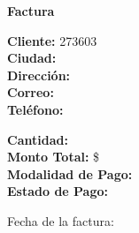 \documentclass{article}
\begin{document}
\begin{center}
    {\LARGE \textbf{Factura}}\\[1cm]
\end{center}

\textbf{Cliente:} 273603 \\
\textbf{Ciudad:}  \\
\textbf{Dirección:}  \\
\textbf{Correo:}  \\
\textbf{Teléfono:}  \\

\vspace{0.5cm}

\textbf{Cantidad:}  \\
\textbf{Monto Total:} \$  \\
\textbf{Modalidad de Pago:}  \\
\textbf{Estado de Pago:}  \\

\vspace{1cm}

Fecha de la factura: 
\end{document}
